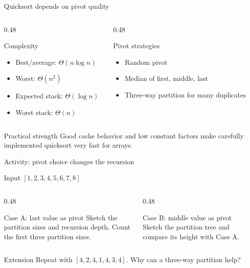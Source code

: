 \documentclass[aspectratio=169]{beamer}
\begin{document}
\begin{frame}{Quicksort depends on pivot quality}
  \small
  \begin{columns}[T]
    \begin{column}{0.48\textwidth}
      \begin{block}{Complexity}
        \begin{itemize}
          \item Best/average: $\Theta(n\log n)$
          \item Worst: $\Theta(n^2)$
          \item Expected stack: $\Theta(\log n)$
          \item Worst stack: $\Theta(n)$
        \end{itemize}
      \end{block}
    \end{column}
    \begin{column}{0.48\textwidth}
      \begin{exampleblock}{Pivot strategies}
        \begin{itemize}
          \item Random pivot
          \item Median of first, middle, last
          \item Three-way partition for many duplicates
        \end{itemize}
      \end{exampleblock}
    \end{column}
  \end{columns}
  \begin{alertblock}{Practical strength}
    Good cache behavior and low constant factors make carefully implemented
    quicksort very fast for arrays.
  \end{alertblock}
\end{frame}

\begin{frame}{Activity: pivot choice changes the recursion}
  \small
  \begin{block}{Input}
    $[1,2,3,4,5,6,7,8]$
  \end{block}
  \begin{columns}[T]
    \begin{column}{0.48\textwidth}
      \begin{exampleblock}{Case A: last value as pivot}
        Sketch the partition sizes and recursion depth. Count the first three
        partition sizes.
      \end{exampleblock}
    \end{column}
    \begin{column}{0.48\textwidth}
      \begin{alertblock}{Case B: middle value as pivot}
        Sketch the partition tree and compare its height with Case A.
      \end{alertblock}
    \end{column}
  \end{columns}
  \begin{block}{Extension}
    Repeat with $[4,2,4,1,4,3,4]$. Why can a three-way partition help?
  \end{block}
\end{frame}
\end{document}
